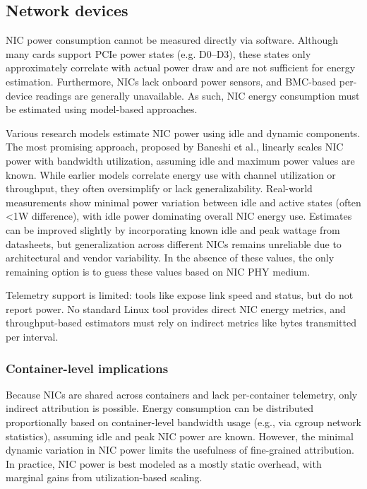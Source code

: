 \subsection{Network devices}

NIC power consumption cannot be measured directly via software. Although many cards support PCIe power states (e.g. D0–D3), these states only approximately correlate with actual power draw and are not sufficient for energy estimation. Furthermore, NICs lack onboard power sensors, and BMC-based per-device readings are generally unavailable. As such, NIC energy consumption must be estimated using model-based approaches.

Various research models estimate NIC power using idle and dynamic components. The most promising approach, proposed by Baneshi et al., linearly scales NIC power with bandwidth utilization, assuming idle and maximum power values are known. While earlier models correlate energy use with channel utilization or throughput, they often oversimplify or lack generalizability. Real-world measurements show minimal power variation between idle and active states (often \textless1W difference), with idle power dominating overall NIC energy use. Estimates can be improved slightly by incorporating known idle and peak wattage from datasheets, but generalization across different NICs remains unreliable due to architectural and vendor variability. In the absence of these values, the only remaining option is to guess these values based on NIC PHY medium.

Telemetry support is limited: tools like  expose link speed and status, but do not report power. No standard Linux tool provides direct NIC energy metrics, and throughput-based estimators must rely on indirect metrics like bytes transmitted per interval.

\subsubsection{Container-level implications}
Because NICs are shared across containers and lack per-container telemetry, only indirect attribution is possible. Energy consumption can be distributed proportionally based on container-level bandwidth usage (e.g., via cgroup network statistics), assuming idle and peak NIC power are known. However, the minimal dynamic variation in NIC power limits the usefulness of fine-grained attribution. In practice, NIC power is best modeled as a mostly static overhead, with marginal gains from utilization-based scaling.

